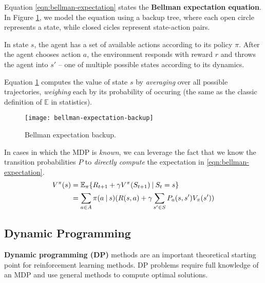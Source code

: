 Equation \ref{eqn:bellman-expectation} states the \textbf{Bellman expectation equation}.
In Figure \ref{fig:expectation-backup}, we model the equation using a backup tree, where each open circle represents a state, while closed cicles represent state-action pairs.

In state $s$, the agent has a set of available actions according to its policy $\pi$.
After the agent chooses action $a$, the environment responds with reward $r$ and throws the agent into $s'$ -- one of multiple possible states according to its dynamics.

Equation \ref{fig:expectation-backup} computes the value of state $s$ by \emph{averaging} over all possible trajectories, \emph{weighing} each by its probability of occuring (the same as the classic definition of $\mathbb{E}$ in statistics).

\begin{figure}[ht]
    \centering
    \caption{Bellman expectation backup.} \label{fig:expectation-backup}
    \vspace*{0.2cm}
    \texttt{[image: bellman-expectation-backup]}
\end{figure}

In cases in which the MDP is \emph{known}, we can leverage the fact that we know the transition probabilities $P$ to \emph{directly compute} the expectation in \ref{eqn:bellman-expectation}.
\begin{equation}
    \begin{aligned}
        V^{\pi}(s)
            &= \mathbb{E}_{\pi}\{ R_{t+1} + \gamma V^{\pi}(S_{t+1}) \:\vert\: S_{t} = s \} \\
            &= \sum_{a \in A}{
                \pi(a \:\vert\: s) ( R(s, a) + \gamma \sum_{s' \in S}{
                    P_a(s, s') V_{\pi}(s')
                })
            }
    \end{aligned}
\end{equation}


\subsection{Dynamic Programming} \label{rl:dp}
\textbf{Dynamic programming (DP)} methods are an important theoretical starting point for reinforcement learning methods. DP problems require full knowledge of an MDP and use general methods to compute optimal solutions.

